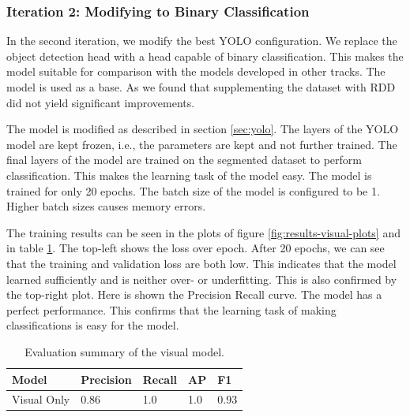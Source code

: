 \subsubsection{Iteration 2: Modifying to Binary Classification}

In the second iteration, we modify the best YOLO configuration. We replace the object detection head with a head capable of binary classification. This makes the model suitable for comparison with the models developed in other tracks. The model  is used as a base. As we found that supplementing the dataset with RDD did not yield significant improvements.

The model is modified as described in section \ref{sec:yolo}. The layers of the YOLO model are kept frozen, i.e., the parameters are kept and not further trained. The final layers of the model are trained on the segmented dataset to perform classification. This makes the learning task of the model easy. The model is trained for only 20 epochs. The batch size of the model is configured to be 1. Higher batch sizes causes memory errors.

The training results can be seen in the plots of figure \ref{fig:results-visual-plots} and in table \ref{tab:results-visual-plots}. The top-left shows the loss over epoch. After 20 epochs, we can see that the training and validation loss are both low. This indicates that the model learned sufficiently and is neither over- or underfitting. This is also confirmed by the top-right plot. Here is shown the Precision Recall curve. The model has a perfect performance. This confirms that the learning task of making classifications is easy for the model.


\begin{table}[ht]
\centering
\begin{tabular}{|l|l|l|l|l|}
\hline
\textbf{Model} & \textbf{Precision} & \textbf{Recall} & \textbf{AP} & \textbf{F1} \\ \hline
Visual Only & 0.86               & 1.0             & 1.0         & 0.93        \\ \hline
\end{tabular}
\captionsetup{width=.90\textwidth}
\caption{Evaluation summary of the visual model.}
\label{tab:results-visual-plots}
\end{table}


